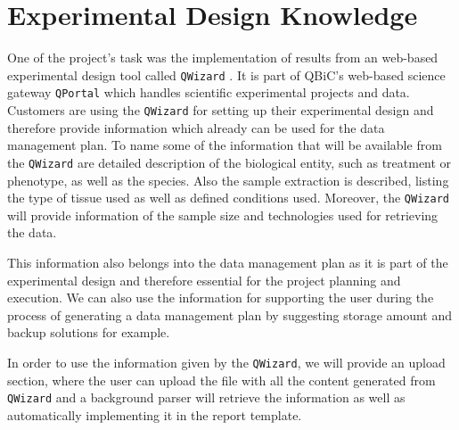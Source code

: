 \section{Experimental Design Knowledge}
One of the project's task was the implementation of results from an web-based experimental design tool called \texttt{QWizard} \cite{qwizard}. It is part of QBiC's web-based science gateway \texttt{QPortal} which handles scientific experimental projects and data. Customers are using the \texttt{QWizard} for setting up their experimental design and therefore provide information which already can be used for the data management plan. To name some of the information that will be available from the \texttt{QWizard} are detailed description of the biological entity, such as treatment or phenotype, as well as the species. Also the sample extraction is described, listing the type of tissue used as well as defined conditions used. Moreover, the \texttt{QWizard} will provide information of the sample size and technologies used for retrieving the data.

This information also belongs into the data management plan as it is part of the experimental design and therefore essential for the project planning and execution. We can also use the information for supporting the user during the process of generating a data management plan by suggesting storage amount and backup solutions for example.

In order to use the information given by the \texttt{QWizard}, we will provide an upload section, where the user can upload the file with all the content generated from \texttt{QWizard} and a background parser will retrieve the information as well as automatically implementing it in the report template.